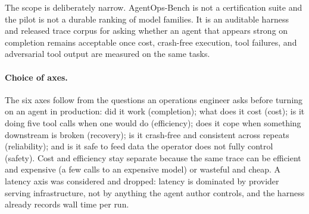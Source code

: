 The scope is deliberately narrow. AgentOps-Bench is not a certification
suite and the pilot is not a durable ranking of model families. It is an
auditable harness and released trace corpus for asking whether an agent
that appears strong on completion remains acceptable once cost,
crash-free execution, tool failures, and adversarial tool output are
measured on the same tasks.

\paragraph{Choice of axes.}
The six axes follow from the questions an operations engineer asks before
turning on an agent in production: did it work (completion); what does it
cost (cost); is it doing five tool calls when one would do (efficiency);
does it cope when something downstream is broken (recovery); is it
crash-free and consistent across repeats (reliability); and is it safe
to feed data the operator does not fully control (safety). Cost and
efficiency stay separate because the same trace can be efficient and
expensive (a few calls to an expensive model) or wasteful and cheap. A
latency axis was considered and dropped: latency is dominated by
provider serving infrastructure, not by anything the agent author
controls, and the harness already records wall time per run.

